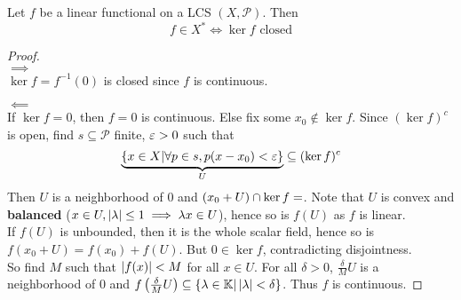 \documentclass{article}
\begin{document}
\begin{nlemma}\label{lem:lcs-dual}
  Let $f$ be a linear functional on a LCS $(X, \mathcal P)$. Then
  $$f \in X^* \iff \ker f \text{ closed}$$
\end{nlemma}
\begin{proof}~\\
  $\implies$ \\
  $\ker f = f^{-1}(0)$ is closed since $f$ is continuous.
  
  $\impliedby$ \\
  If $\ker f = 0$, then $f = 0$ is continuous. Else fix some $x_0 \nin \ker f$. Since $(\ker f)^c$ is open, find $s \subseteq \mathcal P$ finite, $\varepsilon > 0$ such that
  $$\underbrace{\{x \in X | \forall p \in s, p(x - x_0) < \varepsilon\}}_U \subseteq (\ker f)^c$$
  Then $U$ is a neighborhood of $0$ and $(x_0 + U) \cap \ker f = \empty$. Note that $U$ is convex and {\bf balanced} ($x \in U, \left\lvert \lambda\right\rvert \le 1 \implies \lambda x \in U$), hence so is $f(U)$ as $f$ is linear. \\
  If $f(U)$ is unbounded, then it is the whole scalar field, hence so is $f(x_0 + U) = f(x_0) + f(U)$. But $0 \in \ker f$, contradicting disjointness. \\
  So find $M$ such that $\left\lvert f(x)\right\rvert < M$ for all $x \in U$. For all $\delta > 0$, $\frac\delta M U$ is a neighborhood of $0$ and $f\left(\frac\delta M U\right) \subseteq \{\lambda \in \mathbb K | \left\lvert \lambda\right\rvert < \delta\}$. Thus $f$ is continuous.
\end{proof}
\end{document}

